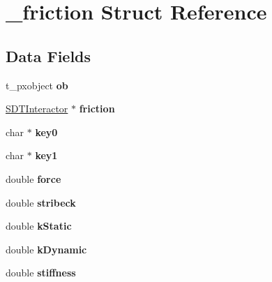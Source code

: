 \hypertarget{struct__friction}{}\section{\+\_\+friction Struct Reference}
\label{struct__friction}
\subsection*{Data Fields}
\begin{DoxyCompactItemize}
\item 
\hypertarget{struct__friction_a55b4380edb216f04a1c42b9095594963}{}t\+\_\+pxobject {\bfseries ob}\label{struct__friction_a55b4380edb216f04a1c42b9095594963}

\item 
\hypertarget{struct__friction_a97c381f9820c022a8bfbe1a516deacf5}{}\hyperlink{struct_s_d_t_interactor}{S\+D\+T\+Interactor} $\ast$ {\bfseries friction}\label{struct__friction_a97c381f9820c022a8bfbe1a516deacf5}

\item 
\hypertarget{struct__friction_ac2e1b301fde8fcd4867bc37f7432b345}{}char $\ast$ {\bfseries key0}\label{struct__friction_ac2e1b301fde8fcd4867bc37f7432b345}

\item 
\hypertarget{struct__friction_ad9fbb57ecc842a70f5ace70ead34f3ac}{}char $\ast$ {\bfseries key1}\label{struct__friction_ad9fbb57ecc842a70f5ace70ead34f3ac}

\item 
\hypertarget{struct__friction_aab6099c236e628500314462a9b259d66}{}double {\bfseries force}\label{struct__friction_aab6099c236e628500314462a9b259d66}

\item 
\hypertarget{struct__friction_a351eca82c384d974a6b140308a5a04a2}{}double {\bfseries stribeck}\label{struct__friction_a351eca82c384d974a6b140308a5a04a2}

\item 
\hypertarget{struct__friction_a87c5b20395d5eacf31c6b4b956a86f20}{}double {\bfseries k\+Static}\label{struct__friction_a87c5b20395d5eacf31c6b4b956a86f20}

\item 
\hypertarget{struct__friction_a066458cbb0e3a4434b3c02d0f2673b77}{}double {\bfseries k\+Dynamic}\label{struct__friction_a066458cbb0e3a4434b3c02d0f2673b77}

\item 
\hypertarget{struct__friction_a9e58169b625b632c35218c00425d2b87}{}double {\bfseries stiffness}\label{struct__friction_a9e58169b625b632c35218c00425d2b87}


\end{DoxyCompactItemize}
